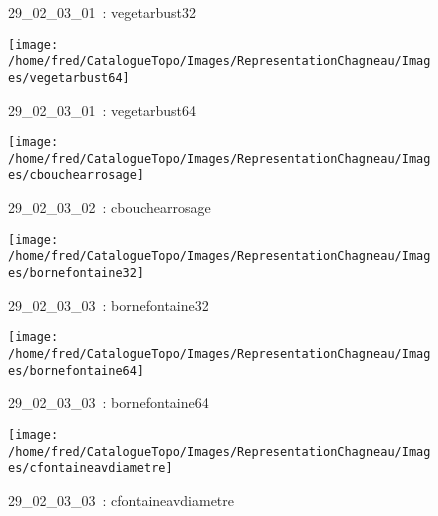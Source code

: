 \documentclass[12pt,titlepage]{book}
\begin{document}
\begin{figure}[h!]
\begin{minipage}[t]{3cm}
\begin{center}
      \caption[~29\_02\_03\_01]{\small{29\_02\_03\_01~:} \tiny{vegetarbust32}}\label{vegetarbust32}
    \end{center}
  \end{minipage}
  \begin{minipage}[t]{3cm}
    \begin{center}
      \texttt{[image: /home/fred/CatalogueTopo/Images/RepresentationChagneau/Images/vegetarbust64]}
      \caption[~29\_02\_03\_01]{\small{29\_02\_03\_01~:} \tiny{vegetarbust64}}\label{vegetarbust64}
    \end{center}
  \end{minipage}
  \begin{minipage}[t]{3cm}
    \begin{center}
      \texttt{[image: /home/fred/CatalogueTopo/Images/RepresentationChagneau/Images/cbouchearrosage]}
      \caption[~29\_02\_03\_02]{\small{29\_02\_03\_02~:} \tiny{cbouchearrosage}}\label{cbouchearrosage}
    \end{center}
  \end{minipage}
  \begin{minipage}[t]{3cm}
    \begin{center}
      \texttt{[image: /home/fred/CatalogueTopo/Images/RepresentationChagneau/Images/bornefontaine32]}
      \caption[~29\_02\_03\_03]{\small{29\_02\_03\_03~:} \tiny{bornefontaine32}}\label{bornefontaine32}
    \end{center}
  \end{minipage}
  \begin{minipage}[t]{3cm}
    \begin{center}
      \texttt{[image: /home/fred/CatalogueTopo/Images/RepresentationChagneau/Images/bornefontaine64]}
      \caption[~29\_02\_03\_03]{\small{29\_02\_03\_03~:} \tiny{bornefontaine64}}\label{bornefontaine64}
    \end{center}
  \end{minipage}
  \begin{minipage}[t]{3cm}
    \begin{center}
      \texttt{[image: /home/fred/CatalogueTopo/Images/RepresentationChagneau/Images/cfontaineavdiametre]}
      \caption[~29\_02\_03\_03]{\small{29\_02\_03\_03~:} \tiny{cfontaineavdiametre}}\label{cfontaineavdiametre}

\end{center}
\end{minipage}
\end{figure}
\end{document}

